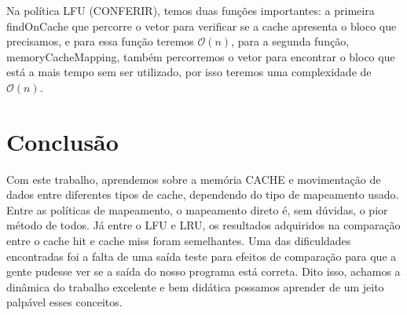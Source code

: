 \documentclass{article}
\begin{document}
Na política LFU (CONFERIR), temos duas funções importantes: a primeira
findOnCache que percorre o vetor para verificar se a cache apresenta o bloco que precisamos, e para essa função teremos $\mathcal{O}(n)$,
para a segunda função, memoryCacheMapping, também percorremos o vetor para encontrar o bloco que está a mais tempo sem ser utilizado, por isso 
teremos uma complexidade de $\mathcal{O}(n)$.



\clearpage
\section{Conclusão}
Com este trabalho, aprendemos sobre a memória CACHE e movimentação de dados entre diferentes tipos de cache, dependendo do
tipo de mapeamento usado.
Entre as políticas de mapeamento, o mapeamento direto é, sem dúvidas, o pior método de todos. Já entre o LFU e LRU,
os resultados adquiridos na comparação entre o cache hit e cache miss foram semelhantes.
Uma das dificuldades encontradas foi a falta de uma saída teste para efeitos de comparação para que a gente pudesse ver 
se a saída do nosso programa está correta. Dito isso, achamos a dinâmica do trabalho excelente e bem didática possamos aprender de um jeito palpável esses conceitos.
\end{document}
